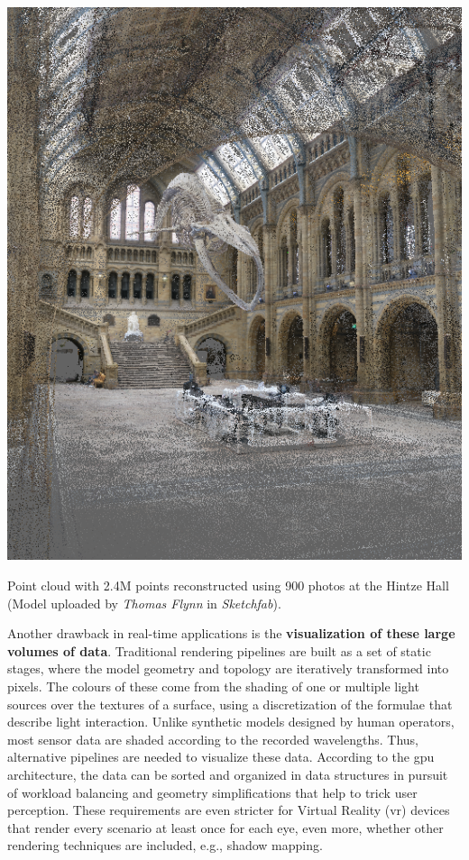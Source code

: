 \begin{marginfigure}[-.5cm]
	\includegraphics{figs/introduction/hintze.png}
	\caption{Point cloud with 2.4M points reconstructed using 900 photos at the Hintze Hall (Model uploaded by \textit{Thomas Flynn} in \textit{Sketchfab}).  }
	\label{fig:hintze_hall}
\end{marginfigure}
Another drawback in real-time applications is the \textbf{visualization of these large volumes of data}. Traditional rendering pipelines are built as a set of static stages, where the model geometry and topology are iteratively transformed into pixels. The colours of these come from the shading of one or multiple light sources over the textures of a surface, using a discretization of the formulae that describe light interaction. Unlike synthetic models designed by human operators, most sensor data are shaded according to the recorded wavelengths. Thus, alternative pipelines are needed to visualize these data. According to the \acrshort{gpu} architecture, the data can be sorted and organized in data structures in pursuit of workload balancing and geometry simplifications that help to trick user perception. These requirements are even stricter for Virtual Reality (\acrshort{vr}) devices that render every scenario at least once for each eye, even more, whether other rendering techniques are included, e.g., shadow mapping.  

